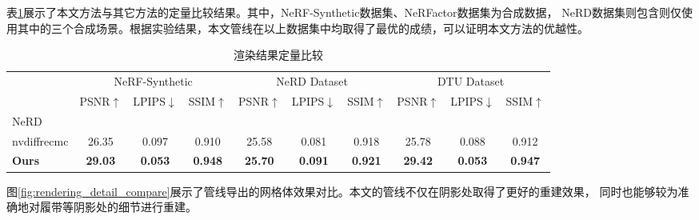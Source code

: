 表\ref{tab:dataset_comparison}展示了本文方法与其它方法的定量比较结果。其中，NeRF-Synthetic数据集、NeRFactor数据集为合成数据，
NeRD数据集则包含则仅使用其中的三个合成场景。根据实验结果，本文管线在以上数据集中均取得了最优的成绩，可以证明本文方法的优越性。

\begin{table}[h]
  \centering
  \caption{渲染结果定量比较}
  \begin{tabular}{l ccc ccc ccc}
      \toprule
      & \multicolumn{3}{c}{NeRF-Synthetic} & \multicolumn{3}{c}{NeRD Dataset} & \multicolumn{3}{c}{DTU Dataset} \\
      \cmidrule(lr){2-4} \cmidrule(lr){5-7} \cmidrule(lr){8-10}
      & PSNR$\uparrow$ & LPIPS$\downarrow$ & SSIM$\uparrow$ & PSNR$\uparrow$ & LPIPS$\downarrow$ & SSIM$\uparrow$ & PSNR$\uparrow$ & LPIPS$\downarrow$ & SSIM$\uparrow$ \\
      \midrule
      NeRD & & & & & & & & & \\
      nvdiffrecmc & 26.35 & 0.097 & 0.910 & 25.58 & 0.081 & 0.918 & 25.78 & 0.088 & 0.912 \\
      \textbf{Ours} & \textbf{29.03} & \textbf{0.053} & \textbf{0.948} & \textbf{25.70} & \textbf{0.091} & \textbf{0.921} & \textbf{29.42} & \textbf{0.053} & \textbf{0.947} \\
      \bottomrule
  \end{tabular}
  \label{tab:dataset_comparison}
\end{table}

图\ref{fig:rendering_detail_compare}展示了管线导出的网格体效果对比。本文的管线不仅在阴影处取得了更好的重建效果，
同时也能够较为准确地对履带等阴影处的细节进行重建。

